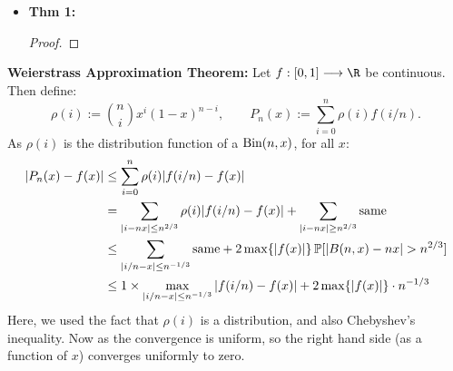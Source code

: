 \documentclass[11pt]{article}
\newenvironment{INT}[1][]{\begin{itemize}\small\item\textbf{#1}}{\end{itemize}}
\begin{document}
\begin{recent}
\begin{itemise}
\begin{INT}[Thm 1:]
\begin{proof}
\end{proof}
\end{INT}
\item \textbf{Weierstrass Approximation Theorem:}
Let $f:[0,1]\to\R$ be continuous. Then define:
\[\rho(i):={n\choose i}x^i(1-x)^{n-i},\qquad P_n(x):=\sum_{i=0}^{n}\rho(i)f(i/n).\]
As $\rho(i)$ is the distribution function of a $\textup{Bin}(n,x)$, for all $x$:
\begin{alignat*}{2}
|P_n(x)-f(x)|&\leq\sum_{i=0}^{n}\rho(i)|f(i/n)-f(x)|%
\\&=\sum_{|i-nx|\leq n^{2/3}}\rho(i)|f(i/n)-f(x)|+\sum_{|i-nx|\geq n^{2/3}}\textup{same}%
\\&\leq\sum_{|i/n-x|\leq n^{-1/3}}\textup{same}+2\max\{|f(x)|\}\Prob[|B(n,x)-nx|>n^{2/3}]%
\\&\leq1\times\max_{|i/n-x|\leq n^{-1/3}}|f(i/n)-f(x)|+2\max\{|f(x)|\}\cdot n^{-1/3}%
\end{alignat*}
Here, we used the fact that $\rho(i)$ is a distribution, and also Chebyshev's inequality. Now as the convergence is uniform, so the right hand side (as a function of $x$) converges uniformly to zero.
\end{itemise}

\end{recent}
\end{document}
